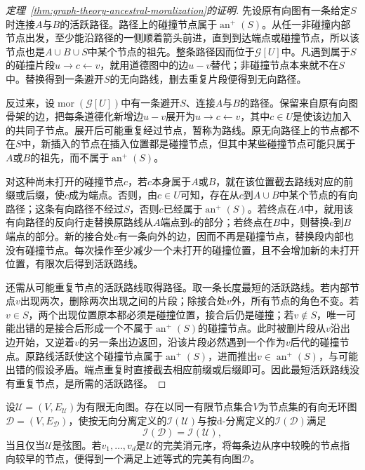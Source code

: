 \begin{proof}[定理~\ref{thm:graph-theory-ancestral-moralization}的证明]
先设原有向图有一条给定$S$时连接$A$与$B$的活跃路径。路径上的碰撞节点属于$\operatorname{an}^{+}(S)$。从任一非碰撞内部节点出发，至少能沿路径的一侧顺着箭头前进，直到到达端点或碰撞节点，所以该节点也是$A\cup B\cup S$中某个节点的祖先。整条路径因而位于$\mathcal{G}[U]$中。凡遇到属于$S$的碰撞片段$u\to c\leftarrow v$，就用道德图中的边$u-v$替代；非碰撞节点本来就不在$S$中。替换得到一条避开$S$的无向路线，删去重复片段便得到无向路径。

反过来，设$\operatorname{mor}(\mathcal{G}[U])$中有一条避开$S$、连接$A$与$B$的路径。保留来自原有向图骨架的边，把每条道德化新增边$u-v$展开为$u\to c\leftarrow v$，其中$c\in U$是使该边加入的共同子节点。展开后可能重复经过节点，暂称为路线。原无向路径上的节点都不在$S$中，新插入的节点在插入位置都是碰撞节点，但其中某些碰撞节点可能只属于$A$或$B$的祖先，而不属于$\operatorname{an}^{+}(S)$。

对这种尚未打开的碰撞节点$c$，若$c$本身属于$A$或$B$，就在该位置截去路线对应的前缀或后缀，使$c$成为端点。否则，由$c\in U$可知，存在从$c$到$A\cup B$中某个节点的有向路径；这条有向路径不经过$S$，否则$c$已经属于$\operatorname{an}^{+}(S)$。若终点在$A$中，就用该有向路径的反向行走替换原路线从$A$端点到$c$的部分；若终点在$B$中，则替换$c$到$B$端点的部分。新的接合处$c$有一条向外的边，因而不再是碰撞节点，替换段内部也没有碰撞节点。每次操作至少减少一个未打开的碰撞位置，且不会增加新的未打开位置，有限次后得到活跃路线。

还需从可能重复节点的活跃路线取得路径。取一条长度最短的活跃路线。若内部节点$v$出现两次，删除两次出现之间的片段；除接合处$v$外，所有节点的角色不变。若$v\in S$，两个出现位置原本都必须是碰撞位置，接合后仍是碰撞；若$v\notin S$，唯一可能出错的是接合后形成一个不属于$\operatorname{an}^{+}(S)$的碰撞节点。此时被删片段从$v$沿出边开始，又逆着$v$的另一条出边返回，沿该片段必然遇到一个作为$v$后代的碰撞节点。原路线活跃使这个碰撞节点属于$\operatorname{an}^{+}(S)$，进而推出$v\in\operatorname{an}^{+}(S)$，与可能出错的假设矛盾。端点重复时直接截去相应前缀或后缀即可。因此最短活跃路线没有重复节点，是所需的活跃路径。
\end{proof}

\begin{theorem}[无向图的完美有向图表示]
  \label{thm:graph-theory-chordal-perfect}
  设$\mathcal{U}=(V,E_{\mathcal U})$为有限无向图。存在以同一有限节点集合$V$为节点集的有向无环图$\mathcal{D}=(V,E_{\mathcal D})$，使按无向分离定义的$\mathcal{I}(\mathcal{U})$与按d-分离定义的$\mathcal{I}(\mathcal{D})$满足
  \[
    \mathcal{I}(\mathcal{D})=\mathcal{I}(\mathcal{U}),
  \]
  当且仅当$\mathcal{U}$是弦图。若$v_1,\ldots,v_d$是$\mathcal{U}$的完美消元序，将每条边从序中较晚的节点指向较早的节点，便得到一个满足上述等式的完美有向图$\mathcal{D}$。
\end{theorem}

